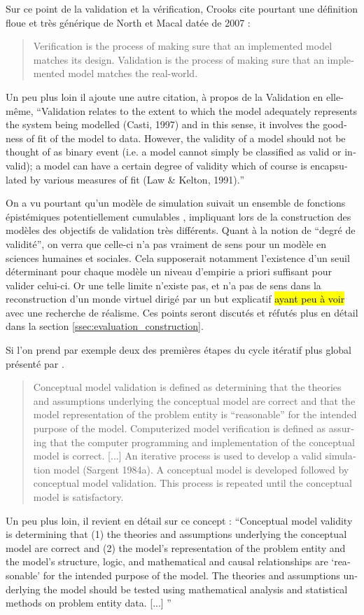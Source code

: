Sur ce point de la validation et la vérification, Crooks cite pourtant une définition floue et très générique de North et Macal datée de 2007 : 

\foreignblockquote{english}[\cite{Crooks2012}]{ Verification is the process of making sure that an implemented model matches its design. Validation is the process of making sure that an implemented model matches the real-world.} Un peu plus loin il ajoute une autre citation, à propos de la Validation en elle-même, \foreignquote{english}{Validation relates to the extent to which the model adequately represents the system being modelled (Casti, 1997) and in this sense, it involves the goodness of fit of the model to data. However, the validity of a model should not be thought of as binary event (i.e. a model cannot simply be classified as valid or invalid); a model can have a certain degree of validity which of course is encapsulated by various measures of fit (Law \& Kelton, 1991).}

On a vu pourtant qu'un modèle de simulation suivait un ensemble de fonctions épistémiques potentiellement cumulables \autocite{Varenne2013b}, impliquant lors de la construction des modèles des objectifs de validation très différents. Quant à la notion de \enquote{degré de validité}, on verra que celle-ci n'a pas vraiment de sens pour un modèle en sciences humaines et sociales. Cela supposerait notamment l'existence d'un seuil déterminant pour chaque modèle un niveau d'empirie a priori suffisant pour valider celui-ci. Or une telle limite n'existe pas, et n'a pas de sens dans la reconstruction d'un monde virtuel dirigé par un but explicatif \hl{ayant peu à voir} avec une recherche de réalisme. Ces points seront discutés et réfutés plus en détail dans la section \ref{ssec:evaluation_construction}.

Si l'on prend par exemple deux des premières étapes du cycle itératif plus global présenté par \textcite{Sargent2010}. 

\foreignblockquote{english}[\cite{Sargent2010}]{Conceptual model validation is defined as determining that the theories and assumptions underlying the conceptual model are correct and that the model representation of the problem entity is \enquote{reasonable}  for the intended purpose of the model. Computerized model verification is defined as assuring that the computer programming and implementation of the conceptual model is correct. [...] An iterative process is used to develop a valid simulation model (Sargent 1984a). A conceptual model is developed followed by conceptual model validation. This process is repeated until the conceptual model is satisfactory.} Un peu plus loin, il revient en détail sur ce concept : \foreignquote{english}{Conceptual model validity is determining that (1) the theories and assumptions underlying the conceptual model are correct and (2) the model’s representation of the problem entity and the model’s structure, logic, and mathematical and causal relationships are \enquote{reasonable} for the intended purpose of the model. The theories and assumptions underlying the model should be tested using mathematical analysis and statistical methods on problem entity data. [...] }


